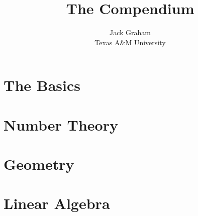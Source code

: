 \documentclass{report}
\title{The Compendium}
\author{
  {Jack Graham}\\	
  {Texas A\&M University}
}
\begin{document}
\maketitle

\tableofcontents

\chapter{The Basics}
  

\chapter{Number Theory}
  

\chapter{Geometry}
  

\chapter{Linear Algebra}
\end{document}
